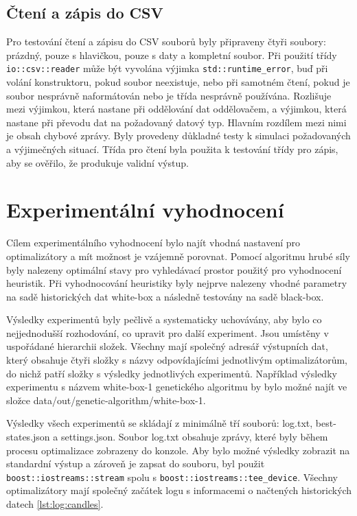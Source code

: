 \section{Čtení a zápis do CSV}
Pro testování čtení a zápisu do CSV souborů byly připraveny čtyři soubory: prázdný, pouze s hlavičkou, pouze s daty a kompletní soubor.
Při použití třídy \texttt{io::csv::reader} může být vyvolána výjimka \texttt{std::runtime\_error}, buď při volání konstruktoru, pokud soubor neexistuje, nebo při samotném čtení, pokud je soubor nesprávně naformátován nebo je třída nesprávně používána.
Rozlišuje mezi výjimkou, která nastane při oddělování dat oddělovačem, a výjimkou, která nastane při převodu dat na požadovaný datový typ.
Hlavním rozdílem mezi nimi je obsah chybové zprávy.
Byly provedeny důkladné testy k simulaci požadovaných a výjimečných situací.
Třída pro čtení byla použita k testování třídy pro zápis, aby se ověřilo, že produkuje validní výstup.

\chapter{Experimentální vyhodnocení}
Cílem experimentálního vyhodnocení bylo najít vhodná nastavení pro optimalizátory a mít možnost je vzájemně porovnat.
Pomocí algoritmu hrubé síly byly nalezeny optimální stavy pro vyhledávací prostor použitý pro vyhodnocení heuristik.
Při vyhodnocování heuristiky byly nejprve nalezeny vhodné parametry na sadě historických dat white-box a následně testovány na sadě black-box.

Výsledky experimentů byly pečlivě a systematicky uchovávány, aby bylo co nejjednodušší rozhodování, co upravit pro další experiment.
Jsou umístěny v uspořádané hierarchii složek.
Všechny mají společný adresář výstupních dat, který obsahuje čtyři složky s názvy odpovídajícími jednotlivým optimalizátorům, do nichž patří složky s výsledky jednotlivých experimentů.
Například výsledky experimentu s názvem white-box-1 genetického algoritmu by bylo možné najít ve složce data/out/genetic-algorithm/white-box-1.

Výsledky všech experimentů se skládají z minimálně tří souborů: log.txt, best-states.json a settings.json.
Soubor log.txt obsahuje zprávy, které byly během procesu optimalizace zobrazeny do konzole.
Aby bylo možné výsledky zobrazit na standardní výstup a zároveň je zapsat do souboru, byl použit \texttt{boost::iostreams::stream} spolu s \texttt{boost::iostreams::tee\_device}.
Všechny optimalizátory mají společný začátek logu s informacemi o načtených historických datech \ref{lst:log:candles}.


